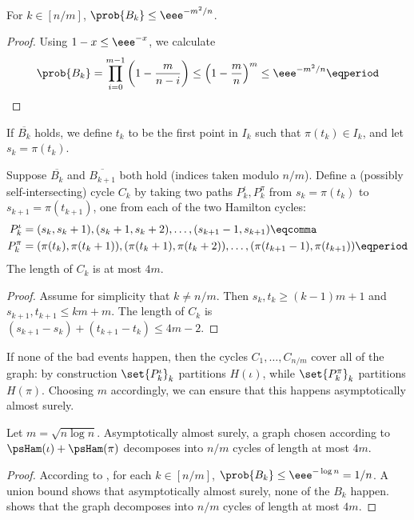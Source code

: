 \documentclass{toc}
\begin{document}
\begin{lemma} \label{lem:b-prob}
 For $k \in [n/m]$, $\prob{B_k} \leq \eee^{-m^2/n}$.
\end{lemma}
\begin{proof}
 Using $1-x \leq \eee^{-x}$, we calculate
\begin{equation}
 \prob{B_k} = \prod_{i=0}^{m-1} \left(1 - \frac{m}{n-i}\right) \leq \left(1 - \frac{m}{n}\right)^m \leq \eee^{-m^2/n} \eqperiod \qedhere
\end{equation}
\end{proof}

If $\overline{B_k}$ holds, we define $t_k$ to be the first point in $I_k$ such that $\pi(t_k) \in I_k$, and let $s_k = \pi(t_k)$.

\begin{lemma} \label{lem:cycle}
 Suppose $\overline{B_k}$ and $\overline{B_{k+1}}$ both hold (indices taken modulo $n/m$). Define a (possibly self-intersecting) cycle $C_k$ by taking two paths $P_k^\iota,P_k^\pi$ from $s_k = \pi(t_k)$ to $s_{k+1} = \pi(t_{k+1})$, one from each of the two Hamilton cycles:
\begin{align*}
 P_k^\iota &= (s_k,s_k+1),(s_k+1,s_k+2),\ldots,(s_{k+1}-1,s_{k+1}) \eqcomma \\
 P_k^\pi &= (\pi(t_k),\pi(t_k+1)),(\pi(t_k+1),\pi(t_k+2)),\ldots,(\pi(t_{k+1}-1),\pi(t_{k+1})) \eqperiod
\end{align*}
 The length of $C_k$ is at most $4m$.
\end{lemma}
\begin{proof}
 Assume for simplicity that $k \neq n/m$. Then $s_k,t_k \geq (k-1)m + 1$ and $s_{k+1},t_{k+1} \leq km + m$. The length of $C_k$ is $(s_{k+1} - s_k) + (t_{k+1} - t_k) \leq 4m-2$.
\end{proof}

If none of the bad events happen, then the cycles $C_1,\ldots,C_{n/m}$ cover all of the graph: by construction $\set{P_k^\iota}_k$ partitions $H(\iota)$, while $\set{P_k^\pi}_k$ partitions $H(\pi)$. Choosing $m$ accordingly, we can ensure that this happens asymptotically almost surely.

\begin{lemma} \label{lem:partition}
 Let $m = \sqrt{n\log n}$. Asymptotically almost surely, a graph chosen according to $\psHam(\iota) + \psHam(\pi)$ decomposes into $n/m$ cycles of %
 length at most $4m$.
\end{lemma}
\begin{proof}
 According to , for each $k \in [n/m]$, $\prob{B_k} \leq \eee^{-\log n} = 1/n$. A union bound shows that asymptotically almost surely, none of the $B_k$ happen.  shows that the graph decomposes into $n/m$ cycles of %
 length at most $4m$.
\end{proof}
\end{document}

